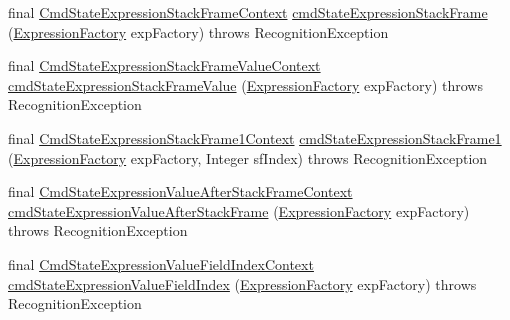 \begin{DoxyCompactItemize}
\item 
final \hyperlink{classgov_1_1nasa_1_1jpf_1_1inspector_1_1server_1_1expression_1_1parser_1_1_expression_grammar_pa1661807291671005dea18d81e1943036}{Cmd\+State\+Expression\+Stack\+Frame\+Context} \hyperlink{classgov_1_1nasa_1_1jpf_1_1inspector_1_1server_1_1expression_1_1parser_1_1_expression_grammar_parser_a5e0feabb2511339d22851a433e2a7e19}{cmd\+State\+Expression\+Stack\+Frame} (\hyperlink{classgov_1_1nasa_1_1jpf_1_1inspector_1_1server_1_1expression_1_1_expression_factory}{Expression\+Factory} exp\+Factory)  throws Recognition\+Exception 
\item 
final \hyperlink{classgov_1_1nasa_1_1jpf_1_1inspector_1_1server_1_1expression_1_1parser_1_1_expression_grammar_pa27eac9bb10e329b6f1427633e5ce16ca}{Cmd\+State\+Expression\+Stack\+Frame\+Value\+Context} \hyperlink{classgov_1_1nasa_1_1jpf_1_1inspector_1_1server_1_1expression_1_1parser_1_1_expression_grammar_parser_a61b18a81f2b5ca691f9645b3a1fb203c}{cmd\+State\+Expression\+Stack\+Frame\+Value} (\hyperlink{classgov_1_1nasa_1_1jpf_1_1inspector_1_1server_1_1expression_1_1_expression_factory}{Expression\+Factory} exp\+Factory)  throws Recognition\+Exception 
\item 
final \hyperlink{classgov_1_1nasa_1_1jpf_1_1inspector_1_1server_1_1expression_1_1parser_1_1_expression_grammar_pabec1adacda521b9e6ed9ea64caf537b4}{Cmd\+State\+Expression\+Stack\+Frame1\+Context} \hyperlink{classgov_1_1nasa_1_1jpf_1_1inspector_1_1server_1_1expression_1_1parser_1_1_expression_grammar_parser_a7b51fc0f0baff269b98a4705322e2242}{cmd\+State\+Expression\+Stack\+Frame1} (\hyperlink{classgov_1_1nasa_1_1jpf_1_1inspector_1_1server_1_1expression_1_1_expression_factory}{Expression\+Factory} exp\+Factory, Integer sf\+Index)  throws Recognition\+Exception 
\item 
final \hyperlink{classgov_1_1nasa_1_1jpf_1_1inspector_1_1server_1_1expression_1_1parser_1_1_expression_grammar_pa89116a9ed8dad2a185081bb1175595f7}{Cmd\+State\+Expression\+Value\+After\+Stack\+Frame\+Context} \hyperlink{classgov_1_1nasa_1_1jpf_1_1inspector_1_1server_1_1expression_1_1parser_1_1_expression_grammar_parser_a3c4b19fe3874c3c607c97ca475d31322}{cmd\+State\+Expression\+Value\+After\+Stack\+Frame} (\hyperlink{classgov_1_1nasa_1_1jpf_1_1inspector_1_1server_1_1expression_1_1_expression_factory}{Expression\+Factory} exp\+Factory)  throws Recognition\+Exception 
\item 
final \hyperlink{classgov_1_1nasa_1_1jpf_1_1inspector_1_1server_1_1expression_1_1parser_1_1_expression_grammar_pa31d705710a4d9acddfdd67c37ac04c8a}{Cmd\+State\+Expression\+Value\+Field\+Index\+Context} \hyperlink{classgov_1_1nasa_1_1jpf_1_1inspector_1_1server_1_1expression_1_1parser_1_1_expression_grammar_parser_a300497ebff4ec0759e1a294e9d6a7920}{cmd\+State\+Expression\+Value\+Field\+Index} (\hyperlink{classgov_1_1nasa_1_1jpf_1_1inspector_1_1server_1_1expression_1_1_expression_factory}{Expression\+Factory} exp\+Factory)  throws Recognition\+Exception 

\end{DoxyCompactItemize}
